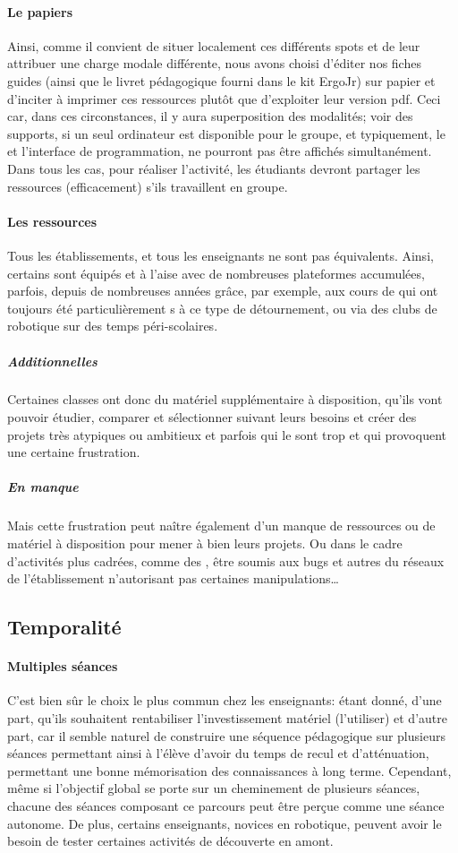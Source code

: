         \paragraph{Le papiers}
            Ainsi, comme il convient de situer localement ces différents spots et de leur attribuer une charge modale différente, nous avons choisi d'éditer nos fiches guides (ainsi que le livret pédagogique fourni dans le kit ErgoJr) sur papier et d'inciter à imprimer ces ressources plutôt que d'exploiter leur version pdf. Ceci car, dans ces circonstances, il y aura superposition des modalités; voir des supports, si un seul ordinateur est disponible pour le groupe, et typiquement, le  et l'interface de programmation, ne pourront pas être affichés simultanément. Dans tous les cas, pour réaliser l'activité, les étudiants devront partager les ressources (efficacement) s'ils travaillent en groupe.
        \paragraph{Les ressources}
            Tous les établissements, et tous les enseignants ne sont pas équivalents. Ainsi, certains sont équipés et à l'aise avec de nombreuses plateformes accumulées, parfois, depuis de nombreuses années grâce, par exemple, aux cours de   qui ont toujours été particulièrement s à ce type de détournement, ou via des clubs de robotique sur des temps péri-scolaires.
            \subparagraph{Additionnelles}
                Certaines classes ont donc du matériel supplémentaire à disposition, qu'ils vont pouvoir étudier, comparer et sélectionner suivant leurs besoins et créer des projets très atypiques ou ambitieux et parfois qui le sont trop et qui provoquent une certaine frustration.
            \subparagraph{En manque}
                Mais cette frustration peut naître également d'un manque de ressources ou de matériel à disposition pour mener à bien leurs projets. Ou dans le cadre d'activités plus cadrées, comme des , être soumis aux bugs et autres   du réseaux de l'établissement n'autorisant pas  certaines manipulations\dots
    \subsection{Temporalité}
        \paragraph{Multiples séances}
            C'est bien sûr le choix le plus commun chez les enseignants: étant donné, d'une part, qu'ils souhaitent rentabiliser l'investissement matériel (\eg l'utiliser) et d'autre part, car il semble naturel de construire une séquence pédagogique sur plusieurs séances permettant ainsi à l'élève d'avoir du temps de recul et d'atténuation, permettant une bonne mémorisation des connaissances à long terme. Cependant, même si l'objectif global se porte sur un cheminement de plusieurs séances, chacune des séances composant ce parcours peut être perçue comme une séance autonome. De plus, certains enseignants, novices en robotique, peuvent avoir le besoin de tester certaines activités de découverte en amont.
